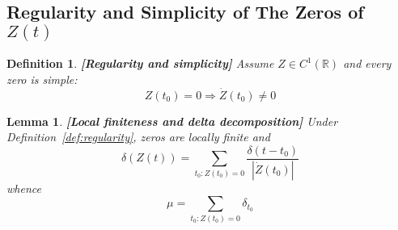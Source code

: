 \documentclass{article}
\newcommand{\tmstrong}[1]{\textbf{#1}}
\newtheorem{definition}{Definition}
\newtheorem{lemma}{Lemma}
\begin{document}
\subsection{Regularity and Simplicity of The Zeros of $Z (t)$}

\begin{definition}
  {\tmstrong{[Regularity and simplicity]\label{def:regularity}}} Assume $Z \in
  C^1 (\mathbb{R})$ and every zero is simple:
  \begin{equation}
    Z (t_0) = 0 \Rightarrow \dot{Z} (t_0) \neq 0
  \end{equation}
\end{definition}

\begin{lemma}
  {\tmstrong{[Local finiteness and delta decomposition]\label{lem:delta}
  }}Under Definition~\ref{def:regularity}, zeros are locally finite and
  \begin{equation}
    \delta (Z (t)) = \sum_{t_0 : Z (t_0) = 0} \frac{\delta (t - t_0)}{|
    \dot{Z} (t_0) |}
  \end{equation}
  whence
  \begin{equation}
    \mu = \sum_{t_0 : Z (t_0) = 0} \delta_{t_0}
  \end{equation}
\end{lemma}
\end{document}

